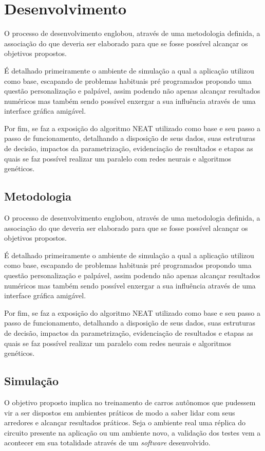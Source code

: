 \chapter{Desenvolvimento}
O processo de desenvolvimento englobou, através de uma metodologia definida, a associação do que deveria ser elaborado para que se fosse possível alcançar os objetivos propostos.

É detalhado primeiramente o ambiente de simulação a qual a aplicação utilizou como base, escapando de problemas habituais pré programados propondo uma questão personalização e palpável, assim podendo não apenas alcançar resultados numéricos mas também sendo possível enxergar a sua influência através de uma interface gráfica amigável.

Por fim, se faz a exposição do algoritmo NEAT utilizado como base e seu passo a passo de funcionamento, detalhando a disposição de seus dados, suas estruturas de decisão, impactos da parametrização, evidenciação de resultados e etapas as quais se faz possível realizar um paralelo com redes neurais e algoritmos genéticos.

\section{Metodologia}

O processo de desenvolvimento englobou, através de uma metodologia definida, a associação do que deveria ser elaborado para que se fosse possível alcançar os objetivos propostos.

É detalhado primeiramente o ambiente de simulação a qual a aplicação utilizou como base, escapando de problemas habituais pré programados propondo uma questão personalização e palpável, assim podendo não apenas alcançar resultados numéricos mas também sendo possível enxergar a sua influência através de uma interface gráfica amigável.

Por fim, se faz a exposição do algoritmo NEAT utilizado como base e seu passo a passo de funcionamento, detalhando a disposição de seus dados, suas estruturas de decisão, impactos da parametrização, evidenciação de resultados e etapas as quais se faz possível realizar um paralelo com redes neurais e algoritmos genéticos.

\section{Simula{\c c}{\~a}o}

O objetivo proposto implica no treinamento de carros autônomos
que pudessem vir a ser dispostos em ambientes práticos de modo
a saber lidar com seus arredores e alcançar resultados
práticos. Seja o ambiente real uma réplica do circuito
presente na aplicação ou um ambiente novo, a validação dos
testes vem a acontecer em sua totalidade através de um
\textit{software} desenvolvido.

